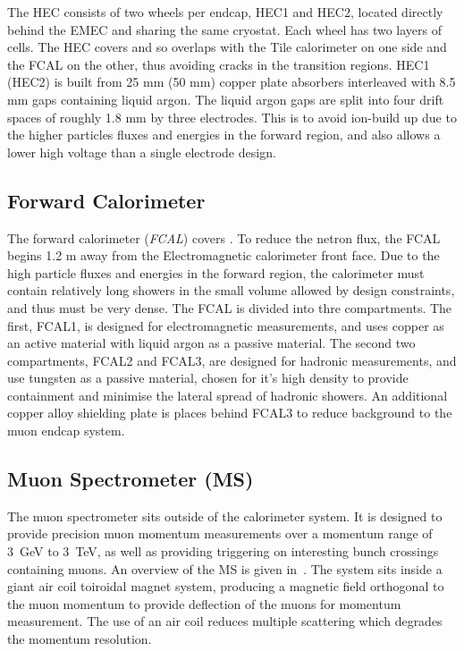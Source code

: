 The HEC consists of two wheels per endcap, HEC1 and HEC2, located directly
behind the EMEC and sharing the same cryostat. Each wheel has two layers of
cells. The HEC covers  and so overlaps with the Tile
calorimeter on one side and the FCAL on the other, thus avoiding cracks in the
transition regions. HEC1 (HEC2) is built from 25 mm (50 mm) copper plate
absorbers interleaved with 8.5 mm gaps containing liquid argon. The liquid
argon gaps are split into four drift spaces of roughly 1.8 mm by three
electrodes. This is to avoid ion-build up due to the higher particles fluxes
and energies in the forward region, and also allows a lower high voltage than a single
electrode design.

\subsection{Forward Calorimeter}

The forward calorimeter ({\it FCAL}) covers . To reduce the
netron flux, the FCAL begins 1.2 m away from the Electromagnetic calorimeter
front face. Due to the high particle fluxes and energies in the forward region,
the calorimeter must contain relatively long showers in the small volume allowed
by design constraints, and thus must be very dense. The FCAL is divided into
thre compartments. The first, FCAL1, is designed for electromagnetic
measurements, and uses copper as an active material with liquid argon as a
passive material. The second two compartments, FCAL2 and FCAL3, are designed for hadronic
measurements, and use tungsten as a passive material, chosen for it's high
density to provide containment and minimise the lateral spread of hadronic
showers. An additional copper alloy shielding plate is places behind FCAL3 to
reduce background to the muon endcap system.

\subsection{Muon Spectrometer (MS)}

The muon spectrometer sits outside of the calorimeter system. It is designed to
provide precision muon momentum measurements over a momentum range of 3~GeV to
3~TeV, as well as providing triggering on interesting bunch crossings containing
muons. An overview of the MS is given in~. The system sits
inside a giant air coil toiroidal magnet system, producing a magnetic field
orthogonal to the muon momentum to provide deflection of the
muons for momentum measurement. The use of an air coil reduces multiple
scattering which degrades the momentum resolution.

